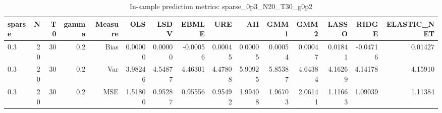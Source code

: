 \begin{table}[!htbp]\centering
\caption{In-sample prediction metrics: sparse_0p3_N20_T30_g0p2}
\label{tab:table2_sparse_0p3_N20_T30_g0p2}
\begin{tabular}{lrrrrrrrrrrrrrr}
\hline
sparse & N & T0 & gamma & Measure & OLS & LSDV & EBMLE & URE & AH & GMM1 & GMM2 & LASSO & RIDGE & ELASTIC_NET \\
\hline
0.3 & 20 & 30 & 0.2 & Bias & 0.00000 & 0.00000 & -0.00056 & 0.00045 & 0.00005 & 0.00054 & 0.00047 & 0.01841 & -0.04716 & 0.01427 \\
0.3 & 20 & 30 & 0.2 & Var & 3.98246 & 4.54877 & 4.46301 & 4.47808 & 5.90925 & 5.85387 & 4.64384 & 4.16269 & 4.14178 & 4.15910 \\
0.3 & 20 & 30 & 0.2 & MSE & 1.51800 & 0.95287 & 0.95556 & 0.95492 & 1.99408 & 1.96703 & 2.06141 & 1.11663 & 1.09039 & 1.11384 \\
\hline
\end{tabular}
\end{table}

